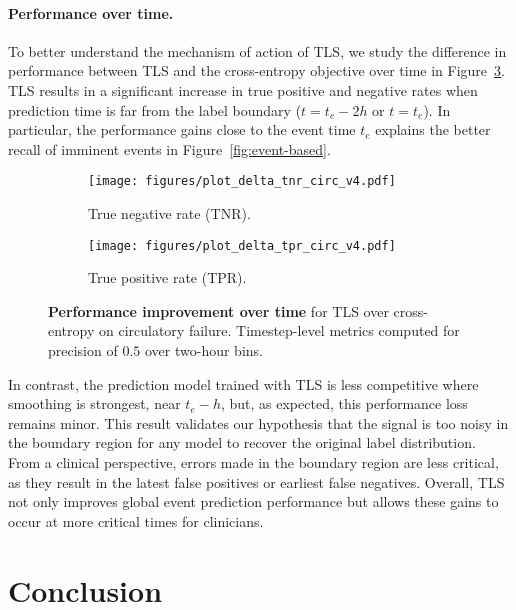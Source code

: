 \documentclass[nohyperref]{article}
\begin{document}
\paragraph{Performance over time.} To better understand the mechanism of action of TLS, we study the difference in performance between TLS and the cross-entropy objective over time in Figure~\ref{fig:plot_delta}. TLS results in a significant increase in true positive and negative rates when prediction time is far from the label boundary ($t=t_e-2h$ or $t=t_e$). In particular, the performance gains close to the event time $t_e$ explains the better recall of imminent events in Figure~\ref{fig:event-based}.

\begin{figure}[h]
\begin{subfigure}[b]{0.47\textwidth}
  \centering
  \texttt{[image: figures/plot\_delta\_tnr\_circ\_v4.pdf]}\caption{True negative rate (TNR).}
  \label{fig:delta_tnr_circ}
\end{subfigure} \hfill
\begin{subfigure}[b]{0.47\textwidth}
 \centering
  \texttt{[image: figures/plot\_delta\_tpr\_circ\_v4.pdf]}\caption{True positive rate (TPR).}
  \label{fig:delta_tpr_circ}
\end{subfigure}
\caption{\textbf{Performance improvement over time} for TLS over cross-entropy on circulatory failure.
Timestep-level metrics computed for precision of $0.5$ over two-hour bins.}
\label{fig:plot_delta}
\end{figure}


In contrast, the prediction model trained with TLS is less competitive where smoothing is strongest, near $t_e-h$, but, as expected, this performance loss remains minor. This result validates our hypothesis that the signal is too noisy in the boundary region for any model to recover the original label distribution. From a clinical perspective, errors made in the boundary region are less critical, as they result in the latest false positives or earliest false negatives. Overall, TLS not only improves global event prediction performance but allows these gains to occur at more critical times for clinicians.



\section{Conclusion}
\end{document}
